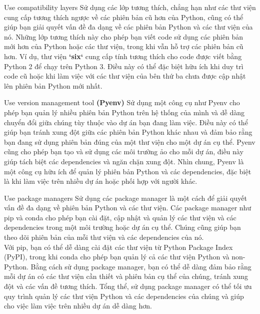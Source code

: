 \documentclass[12pt]{amsart}
\begin{document}
\begin{section}{Use compatibility layers}
    Sử dụng các lớp tương thích, chẳng hạn như các thư viện cung cấp tương thích ngược về các phiên bản cũ hơn của Python, cũng có thể giúp bạn giải quyết vấn đề đa dạng về các phiên bản Python và các thư viện của nó. Những lớp tương thích này cho phép bạn viết code sử dụng các phiên bản mới hơn của Python hoặc các thư viện, trong khi vẫn hỗ trợ các phiên bản cũ hơn. Ví dụ, thư viện \textbf{`six`} cung cấp tính tương thích cho code được viết bằng Python 2 để chạy trên Python 3. Điều này có thể đặc biệt hữu ích khi duy trì code cũ hoặc khi làm việc với các thư viện của bên thứ ba chưa được cập nhật lên phiên bản Python mới nhất.
\end{section}
\begin{section}{Use version management tool \textbf{(Pyenv)}}
    Sử dụng một công cụ như Pyenv cho phép bạn quản lý nhiều phiên bản Python trên hệ thống của mình và dễ dàng chuyển đổi giữa chúng tùy thuộc vào dự án bạn đang làm việc. Điều này có thể giúp bạn tránh xung đột giữa các phiên bản Python khác nhau và đảm bảo rằng bạn đang sử dụng phiên bản đúng của một thư viện cho một dự án cụ thể. Pyenv cũng cho phép bạn tạo và sử dụng các môi trường ảo cho mỗi dự án, điều này giúp tách biệt các dependencies và ngăn chặn xung đột. Nhìn chung, Pyenv là một công cụ hữu ích để quản lý phiên bản Python và các dependencies, đặc biệt là khi làm việc trên nhiều dự án hoặc phối hợp với người khác.

\end{section}
\begin{section}{Use package managers}
    Sử dụng các package manager là một cách để giải quyết vấn đề đa dạng về phiên bản Python và các thư viện. Các package manager như pip và conda cho phép bạn cài đặt, cập nhật và quản lý các thư viện và các dependencies trong một môi trường hoặc dự án cụ thể. Chúng cũng giúp bạn theo dõi phiên bản của mỗi thư viện và các dependencies của nó.\\
    
Với pip, bạn có thể dễ dàng cài đặt các thư viện từ Python Package Index (PyPI), trong khi conda cho phép bạn quản lý cả các thư viện Python và non-Python. Bằng cách sử dụng package manager, bạn có thể dễ dàng đảm bảo rằng mỗi dự án có các thư viện cần thiết và phiên bản cụ thể của chúng, tránh xung đột và các vấn đề tương thích. Tổng thể, sử dụng package manager có thể tối ưu quy trình quản lý các thư viện Python và các dependencies của chúng và giúp cho việc làm việc trên nhiều dự án dễ dàng hơn.
\end{section}
\end{document}
